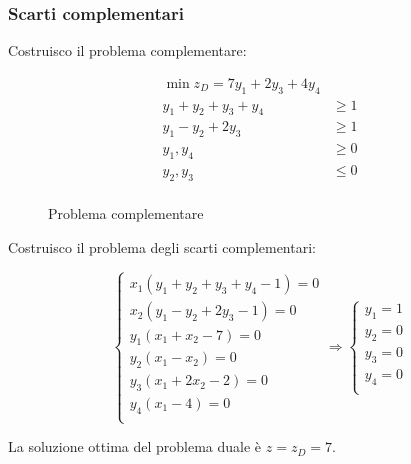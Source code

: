 \documentclass[\main/main.tex]{subfiles}
\begin{document}
\subsubsection*{Scarti complementari}
Costruisco il problema complementare:

\begin{figure}
	\begin{align*}
		\min z_D = 7y_1 + 2y_3 + 4y_4  \\
		y_1 + y_2 + y_3 + y_4 & \geq 1 \\
		y_1 - y_2 + 2y_3      & \geq 1 \\
		y_1,y_4               & \geq 0 \\
		y_2,y_3               & \leq 0 \\
	\end{align*}
	\caption{Problema complementare}
\end{figure}

Costruisco il problema degli scarti complementari:

\[
	\begin{cases}
		x_1(y_1 + y_2 + y_3 + y_4 - 1) = 0 \\
		x_2(y_1 - y_2 + 2y_3 - 1) = 0      \\
		y_1(x_1 + x_2 - 7) = 0             \\
		y_2(x_1 - x_2) = 0                 \\
		y_3(x_1 + 2x_2 -2) = 0             \\
		y_4(x_1 -4) = 0                    \\
	\end{cases}
	\Rightarrow
	\begin{cases}
		y_1 = 1 \\
		y_2 = 0 \\
		y_3 = 0 \\
		y_4 = 0 \\
	\end{cases}
\]

La soluzione ottima del problema duale è $z = z_D = 7$.
\end{document}
